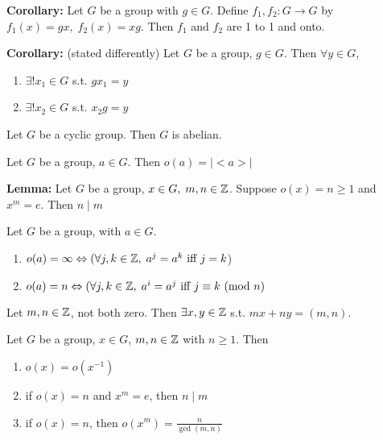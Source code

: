\bigskip 

\noindent 
\textbf{Corollary:} Let $G$ be a group with $g \in G$. Define $f_1, f_2: G \rightarrow G$ by $f_1(x) = gx,\; f_2(x) = xg$. Then $f_1$ and $f_2$ are 1 to 1 and onto.

\bigskip 

\noindent 
\textbf{Corollary:} (stated differently) Let $G$ be a group, $g \in G$. Then $\forall y \in G$,
\begin{enumerate}
    \item $\exists! x_1 \in G$ s.t. $gx_1 = y$
    \item $\exists! x_2 \in G$ s.t. $x_2g = y$
\end{enumerate} 

\thm Let $G$ be a cyclic group. Then $G$ is abelian.

\thm Let $G$ be a group, $a \in G$. Then $o(a) = |<a>|$

\bigskip 

\noindent 
\textbf{Lemma:} Let $G$ be a group, $x \in G, \; m, n \in \mathbb{Z}$. Suppose $o(x) = n \ge 1$ and $x^m = e$. Then $n \mid m$

\prop Let $G$ be a group, with $a \in G$. 
\begin{enumerate}
    \item $o(a) = \infty \Leftrightarrow (\forall j, k \in \mathbb{Z}, \; a^j=a^k \text{ iff } j=k$)
    \item $o(a) = n \Leftrightarrow (\forall j, k \in \mathbb{Z}, \; a^i=a^j \text{ iff } j \equiv k \text{ (mod } n)$
\end{enumerate}

\thm Let $m, n \in \mathbb{Z}$, not both zero. Then $\exists x, y \in \mathbb{Z}$ s.t. $mx + ny = (m, n)$.

\thm Let $G$ be a group, $x \in G$, $m, n \in \mathbb{Z}$ with $n \ge 1$. Then 
\begin{enumerate}
    \item $o(x) = o(x^{-1})$
    \item if $o(x) = n$ and $x^m = e$, then $n \mid m$
    \item if $o(x) = n$, then $o(x^m) = \frac{n}{\gcd(m, n)}$
\end{enumerate}